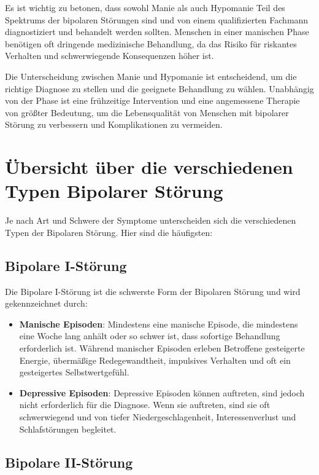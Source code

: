 Es ist wichtig zu betonen, dass sowohl Manie als auch Hypomanie Teil des Spektrums der bipolaren Störungen sind und von einem qualifizierten Fachmann diagnostiziert und behandelt werden sollten. Menschen in einer manischen Phase benötigen oft dringende medizinische Behandlung, da das Risiko für riskantes Verhalten und schwerwiegende Konsequenzen höher ist.

Die Unterscheidung zwischen Manie und Hypomanie ist entscheidend, um die richtige Diagnose zu stellen und die geeignete Behandlung zu wählen. Unabhängig von der Phase ist eine frühzeitige Intervention und eine angemessene Therapie von größter Bedeutung, um die Lebensqualität von Menschen mit bipolarer Störung zu verbessern und Komplikationen zu vermeiden.
\section{Übersicht über die verschiedenen Typen Bipolarer Störung}

Je nach Art und Schwere der Symptome unterscheiden sich die verschiedenen Typen der Bipolaren Störung. Hier sind die häufigsten:

\subsection{Bipolare I-Störung}

Die Bipolare I-Störung ist die schwerste Form der Bipolaren Störung und wird gekennzeichnet durch:

\begin{itemize}
\item \textbf{Manische Episoden}: Mindestens eine manische Episode, die mindestens eine Woche lang anhält oder so schwer ist, dass sofortige Behandlung erforderlich ist. Während manischer Episoden erleben Betroffene gesteigerte Energie, übermäßige Redegewandtheit, impulsives Verhalten und oft ein gesteigertes Selbstwertgefühl.

\item \textbf{Depressive Episoden}: Depressive Episoden können auftreten, sind jedoch nicht erforderlich für die Diagnose. Wenn sie auftreten, sind sie oft schwerwiegend und von tiefer Niedergeschlagenheit, Interessenverlust und Schlafstörungen begleitet.
\end{itemize}

\subsection{Bipolare II-Störung}

